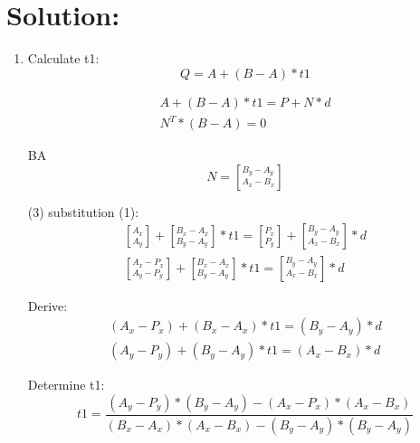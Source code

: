 \documentclass[12pt]{article}
\begin{document}
\section{Solution:}
\begin{enumerate}
	\item Calculate t1:
		\begin{equation}
		Q=A+(B-A)*t1
		\end{equation}
		
		\begin{eqnarray}
		A+(B-A)*t1 = P+N * d\\
		N^T *(B-A) = 0
		\end{eqnarray}
		
		BA 
		\begin{equation}
		N=\left[^{B_y-A_y}_{A_x-B_x}\right]
		\end{equation}
		
		(3) substitution (1):
		\begin{eqnarray}
		\left[^{A_x}_{A_y}\right]+\left[^{B_x-A_x}_{B_y-A_y}\right] * t1=\left[^{P_x}_{P_y}\right]+\left[^{B_y-A_y}_{A_x-B_x}\right] * d\\
		\left[^{A_x - P_x}_{A_y-P_y}\right]+\left[^{B_x-A_x}_{B_y-A_y}\right] * t1=\left[^{B_y-A_y}_{A_x-B_x}\right] * d
		\end{eqnarray}
		
		Derive:
		\begin{eqnarray}
		(A_x - P_x) + (B_x-A_x)*t1 = (B_y-A_y) * d\\
		(A_y-P_y)+(B_y-A_y) * t1 = (A_x-B_x) * d
		\end{eqnarray}
		
		Determine t1:
		\begin{equation}
		t1 = \frac{(A_y-P_y) * (B_y-A_y) - (A_x-P_x)*(A_x-B_x)}{(B_x- A_x) * (A_x - B_x)-(B_y-A_y)*(B_y - A_y)}
		\end{equation}
		

\end{enumerate}
\end{document}

